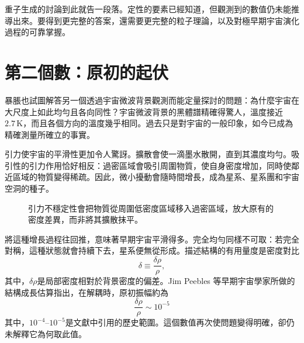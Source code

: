 重子生成的討論到此就告一段落。定性的要素已經知道，但觀測到的數值仍未能推導出來。要得到更完整的答案，還需要更完整的粒子理論，以及對極早期宇宙演化過程的可靠掌握。

\section{第二個數：原初的起伏}

暴脹也試圖解答另一個透過宇宙微波背景觀測而能定量探討的問題：為什麼宇宙在大尺度上如此均勻且各向同性？宇宙微波背景的黑體譜精確得驚人，溫度接近\(2.7\,\mathrm K\)，而且各個方向的溫度幾乎相同。過去只是對宇宙的一般印象，如今已成為精確測量所確立的事實。

引力使宇宙的平滑性更加令人驚訝。擴散會使一滴墨水散開，直到其濃度均勻。吸引性的引力作用恰好相反：過密區域會吸引周圍物質，使自身密度增加，同時使鄰近區域的物質變得稀疏。因此，微小擾動會隨時間增長，成為星系、星系團和宇宙空洞的種子。

\begin{figure}[htbp]
\centering
\begin{coursefitfigure}
\end{coursefitfigure}
\caption{引力不穩定性會把物質從周圍低密度區域移入過密區域，放大原有的密度差異，而非將其擴散抹平。}
\label{fig:c08-gravity-growth}
\end{figure}

將這種增長過程往回推，意味著早期宇宙平滑得多。完全均勻同樣不可取：若完全對稱，這種狀態就會持續下去，星系便無從形成。描述結構的有用量度是密度對比
\begin{equation}
\delta\equiv\frac{\delta\rho}{\rho},
\end{equation}
其中，\(\delta\rho\)是局部密度相對於背景密度的偏差。Jim Peebles 等早期宇宙學家所做的結構成長估算指出，在解耦時，原初振幅約為
\begin{equation}
\boxed{\frac{\delta\rho}{\rho}\sim10^{-5}}
\end{equation}
其中，\(10^{-4}\)--\(10^{-5}\)是文獻中引用的歷史範圍。這個數值再次使問題變得明確，卻仍未解釋它為何取此值。


